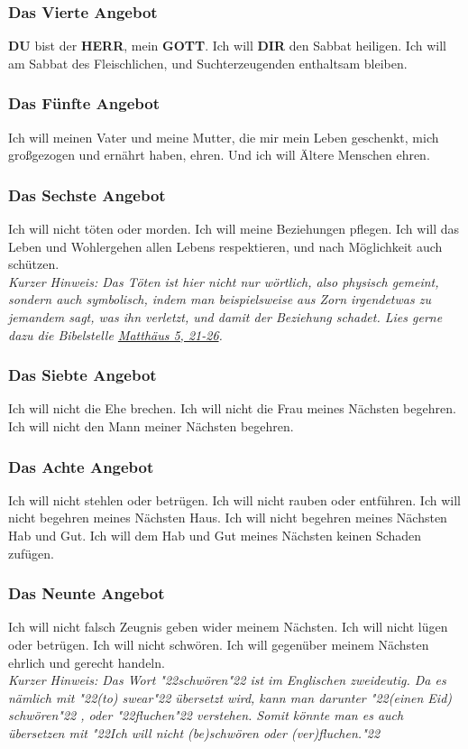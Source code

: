 \documentclass[10pt,a5paper]{article}
\newcommand{\Dir}[0]{\textbf{DIR}}
\newcommand{\Du}[0]{\textbf{DU}}
\newcommand{\Gott}[0]{\textbf{GOTT}}
\newcommand{\Herr}[0]{\textbf{HERR}}
\newcommand{\q}[1]{\char"22{#1}\char"22 }
\begin{document}
	\subsubsection{Das Vierte Angebot}
		{\Du} bist der {\Herr},
		mein {\Gott}.
		Ich will {\Dir} den Sabbat heiligen.
		Ich will am Sabbat des Fleischlichen,
		und Suchterzeugenden enthaltsam bleiben.
		
	\subsubsection{Das F\"unfte Angebot}
		Ich will meinen Vater und meine Mutter,
		die mir mein Leben geschenkt,
		mich gro{\ss}gezogen und ern\"ahrt haben,
		ehren.
		Und ich will \"Altere Menschen ehren.
			
	\subsubsection{Das Sechste Angebot} \label{DasSechsteAngebot}
		Ich will nicht t\"oten oder morden.
		Ich will meine Beziehungen pflegen.
		Ich will das Leben und Wohlergehen allen Lebens respektieren,
		und nach M\"oglichkeit auch sch\"utzen.
		\\
		\textit{Kurzer Hinweis:
		Das T\"oten ist hier nicht nur w\"ortlich,
		also physisch gemeint,
		sondern auch symbolisch,
		indem man beispielsweise aus Zorn irgendetwas zu jemandem sagt,
		was ihn verletzt,
		und damit der Beziehung schadet.
		Lies gerne dazu die Bibelstelle \href{https://www.die-bibel.de/bibeln/online-bibeln/lesen/LU17/MAT.5/Matthäus-5}{Matthäus 5, 21-26}.}
		
	\subsubsection{Das Siebte Angebot}
		Ich will nicht die Ehe brechen.
		Ich will nicht die Frau meines N\"achsten begehren.
		Ich will nicht den Mann meiner N\"achsten begehren.
		
	\subsubsection{Das Achte Angebot}
		Ich will nicht stehlen oder betr\"ugen.
		Ich will nicht rauben oder entf\"uhren.
		Ich will nicht begehren meines N\"achsten Haus.
		Ich will nicht begehren meines N\"achsten Hab und Gut.
		Ich will dem Hab und Gut meines N\"achsten keinen Schaden zuf\"ugen.
		
	\subsubsection{Das Neunte Angebot} \label{DasNeunteAngebot}
		Ich will nicht falsch Zeugnis geben wider meinem N\"achsten.
		Ich will nicht l\"ugen oder betr\"ugen.
		Ich will nicht schw\"oren.
		Ich will gegen\"uber meinem N\"achsten ehrlich und gerecht handeln.
		\\
		\textit{Kurzer Hinweis:
		Das Wort \q{schw\"oren} ist im Englischen zweideutig.
		Da es n\"amlich mit \q{(to) swear} \"ubersetzt wird,
		kann man darunter \q{(einen Eid) schw\"oren},
		oder \q{fluchen} verstehen.
		Somit k\"onnte man es auch \"ubersetzen mit
		\q{Ich will nicht (be)schw\"oren oder (ver)fluchen.}}
		
\end{document}

